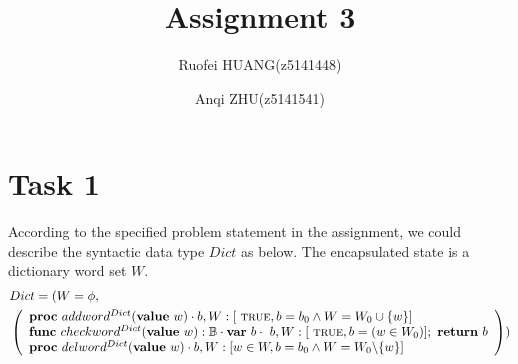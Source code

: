\documentclass[a4paper,12pt,fleqn]{scrartcl}
\title{Assignment 3}
\author{Ruofei HUANG(z5141448)\and
Anqi ZHU(z5141541)
}
\begin{document}
\maketitle
\section{Task 1}

According to the specified problem statement in the assignment, 
we could describe the syntactic data type $Dict$ as below.
The encapsulated state is a dictionary word set $W$.
\begin{align*}
    &Dict = 
    (
        W = \phi,  \\
        &\left( 
            \begin{array}{l}
                \textbf{proc}\ addword^{Dict}(\textbf{value}\ w)\cdot 
                b, W:[ \ \True, b = b_0\And W = W_0\cup \{w\}] \ \\
                \textbf{func}\ checkword^{Dict}(\textbf{value}\ w):\mathbb{B}\cdot
                \textbf{var}\ b\cdot\ b, W:[ \ \True, b = (w\in W_0)];\ \textbf{return}\ b\\
                \textbf{proc}\ delword^{Dict}(\textbf{value}\ w)\cdot
                b, W:[ w\in W, b = b_0\And W = W_0 \backslash \{w\}]
            \end{array}
        \right)
    )
\end{align*}
\end{document}
